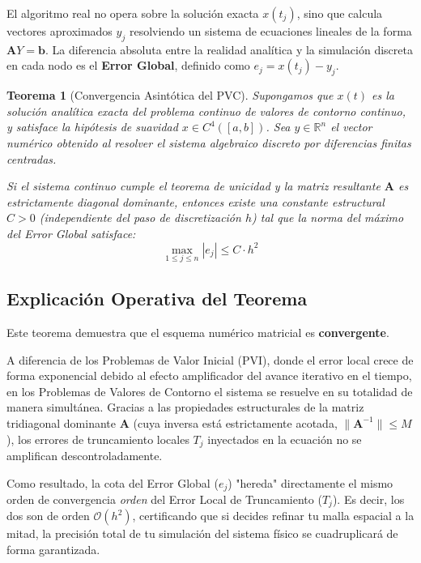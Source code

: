 \documentclass[12pt]{article}
\newtheorem{teorema}{Teorema}
\begin{document}
El algoritmo real no opera sobre la solución exacta $x(t_j)$, sino que calcula vectores aproximados $y_j$ resolviendo un sistema de ecuaciones lineales de la forma $\mathbf{A}Y = \mathbf{b}$. La diferencia absoluta entre la realidad analítica y la simulación discreta en cada nodo es el \textbf{Error Global}, definido como $e_j = x(t_j) - y_j$.

\begin{teorema}[Convergencia Asintótica del PVC]
Supongamos que $x(t)$ es la solución analítica exacta del problema continuo de valores de contorno continuo, y satisface la hipótesis de suavidad $x \in C^4([a,b])$. Sea $y \in \mathbb{R}^n$ el vector numérico obtenido al resolver el sistema algebraico discreto por diferencias finitas centradas.

Si el sistema continuo cumple el teorema de unicidad y la matriz resultante $\mathbf{A}$ es estrictamente diagonal dominante, entonces existe una constante estructural $C > 0$ (independiente del paso de discretización $h$) tal que la norma del máximo del Error Global satisface:
\begin{equation}
    \max_{1 \le j \le n} |e_j| \le C \cdot h^2
\end{equation}
\end{teorema}

\subsection*{Explicación Operativa del Teorema}
Este teorema demuestra que el esquema numérico matricial es \textbf{convergente}. 

A diferencia de los Problemas de Valor Inicial (PVI), donde el error local crece de forma exponencial debido al efecto amplificador del avance iterativo en el tiempo, en los Problemas de Valores de Contorno el sistema se resuelve en su totalidad de manera simultánea. 
Gracias a las propiedades estructurales de la matriz tridiagonal dominante $\mathbf{A}$ (cuya inversa está estrictamente acotada, $\|\mathbf{A}^{-1}\| \le M$), los errores de truncamiento locales $T_j$ inyectados en la ecuación no se amplifican descontroladamente.

Como resultado, la cota del Error Global ($e_j$) "hereda" directamente el mismo orden de convergencia \textit{orden} del Error Local de Truncamiento ($T_j$). Es decir, los dos son de orden $\mathcal{O}(h^2)$, certificando que si decides refinar tu malla espacial a la mitad, la precisión total de tu simulación del sistema físico se cuadruplicará de forma garantizada.
\end{document}
